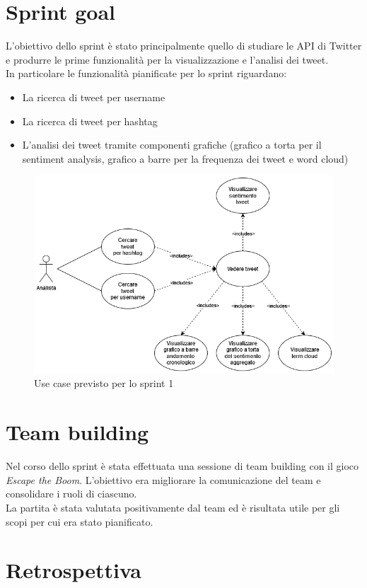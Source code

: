 \documentclass[11pt]{article}
\begin{document}
\section*{Sprint goal}
\justify
L'obiettivo dello sprint è stato principalmente quello di studiare le API di Twitter e produrre le prime funzionalità per la visualizzazione e l'analisi dei tweet.\\
In particolare le funzionalità pianificate per lo sprint riguardano:
\begin{itemize}
    \item La ricerca di tweet per username
    \item La ricerca di tweet per hashtag
    \item L'analisi dei tweet tramite componenti grafiche (grafico a torta per il sentiment analysis, grafico a barre per la frequenza dei tweet e word cloud)
\end{itemize}
\begin{figure}[H]
    \centering
    \includegraphics[width=12cm]{./img/usecase.png}
    \caption{Use case previsto per lo sprint 1}
\end{figure}


\newpage
\section*{Team building}
Nel corso dello sprint è stata effettuata una sessione di team building con il gioco \textit{Escape the Boom}.
L'obiettivo era migliorare la comunicazione del team e consolidare i ruoli di ciascuno.\\
La partita è stata valutata positivamente dal team ed è risultata utile per gli scopi per cui era stato pianificato.


\section*{Retrospettiva}
\end{document}
